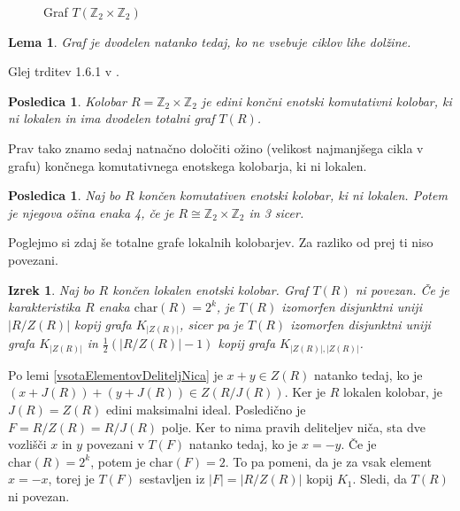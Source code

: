 \documentclass[a4paper, 12pt]{amsart}
\theoremstyle{definition} %
\theoremstyle{plain} %
\newtheorem{lema}[definicija]{Lema}
\newtheorem{izrek}[definicija]{Izrek}
\newtheorem{posledica}[definicija]{Posledica}
\newcommand{\Z}{\mathbb Z}
\begin{document}
\begin{figure}[h!]
\centering
{}
\caption{Graf $T(\Z_2 \times \Z_2)$}
\label{T(Z2xZ2)}
\end{figure}

\begin{lema}
Graf je dvodelen natanko tedaj, ko ne vsebuje ciklov lihe dolžine.
\end{lema}

\proof
Glej trditev 1.6.1 v \cite{Diestel}.
\endproof

\begin{posledica}
Kolobar $R=\Z_2 \times \Z_2$ je edini končni enotski komutativni kolobar, ki ni lokalen in ima dvodelen totalni graf $T(R)$.
\end{posledica}

Prav tako znamo sedaj natnačno določiti ožino (velikost najmanjšega cikla v grafu) končnega komutativnega enotskega kolobarja, ki ni lokalen.

\begin{posledica}
Naj bo $R$ končen komutativen enotski kolobar, ki ni lokalen. Potem je njegova ožina enaka 4, če je $R \cong \Z_2 \times \Z_2$ in 3 sicer.
\end{posledica}

Poglejmo si zdaj še totalne grafe lokalnih kolobarjev. Za razliko od prej ti niso povezani.

\begin{izrek}
\label{klasifikacijaT(R)zaLokalenKolobar}
Naj bo $R$ končen lokalen enotski kolobar. Graf $T(R)$ ni povezan. Če je karakteristika $R$ enaka $\textrm{char} (R) = 2^k$, je $T(R)$ izomorfen disjunktni uniji $|R/Z(R)|$ kopij grafa $K_{|Z(R)|}$, sicer pa je $T(R)$ izomorfen disjunktni uniji grafa $K_{|Z(R)|}$ in $\frac{1}{2}(|R/Z(R)| - 1)$ kopij grafa    $K_{|Z(R)|, |Z(R)|}$.
\end{izrek}

\proof
Po lemi \ref{vsotaElementovDeliteljNica} je $x+y \in Z(R)$ natanko tedaj, ko  je $(x+J(R)) + (y+J(R))  \in Z(R/J(R))$. Ker je $R$ lokalen kolobar, je $J(R) = Z(R)$ edini maksimalni ideal. Posledično je $ F = R/Z(R) = R/J(R)$ polje. Ker to nima pravih deliteljev niča, sta dve vozlišči $x$ in $y$ povezani v $T(F)$ natanko tedaj, ko je $x=-y$. 
Če je $\textrm{char}(R) = 2^k$, potem je $\textrm{char}(F) = 2$. To pa pomeni, da je za vsak element $x = -x$, torej je $T(F)$ sestavljen iz $|F| = |R/Z(R)|$ kopij $K_1$. Sledi, da $T(R)$ ni povezan.
\end{document}
